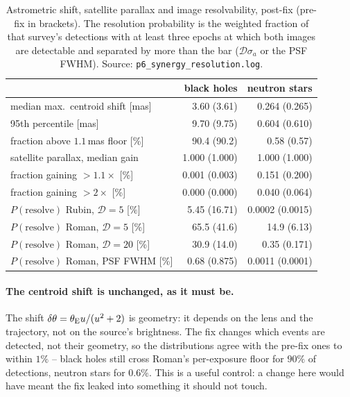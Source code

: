 \documentclass[english,10pt,a4paper]{article}
\newcommand{\tetE}{\theta_{\rm E}}
\begin{document}
\begin{table}[h]
\centering
\caption{Astrometric shift, satellite parallax and image resolvability, post-fix (pre-fix in
brackets). The resolution probability is the weighted fraction of that survey's detections with at
least three epochs at which both images are detectable and separated by more than the bar
($\mathcal{D}\sigma_a$ or the PSF FWHM). Source: \texttt{p6\_synergy\_resolution.log}.}
\label{tab:ast}
\begin{tabular}{lrr}
\toprule
 & black holes & neutron stars \\
\midrule
median max.\ centroid shift [mas]      & 3.60 (3.61)  & 0.264 (0.265) \\
95th percentile [mas]                  & 9.70 (9.75)  & 0.604 (0.610) \\
fraction above $1.1$\,mas floor [\%]   & 90.4 (90.2)  & 0.58 (0.57) \\
\midrule
satellite parallax, median gain        & 1.000 (1.000) & 1.000 (1.000) \\
\quad fraction gaining $>1.1\times$ [\%] & 0.001 (0.003) & 0.151 (0.200) \\
\quad fraction gaining $>2\times$ [\%]   & 0.000 (0.000) & 0.040 (0.064) \\
\midrule
$P(\text{resolve})$ Rubin, $\mathcal{D}=5$ [\%]  & 5.45 (16.71)  & 0.0002 (0.0015) \\
$P(\text{resolve})$ Roman, $\mathcal{D}=5$ [\%]  & 65.5 (41.6)   & 14.9 (6.13) \\
$P(\text{resolve})$ Roman, $\mathcal{D}=20$ [\%] & 30.9 (14.0)   & 0.35 (0.171) \\
$P(\text{resolve})$ Roman, PSF FWHM [\%]         & 0.68 (0.875)  & 0.0011 (0.0001) \\
\bottomrule
\end{tabular}
\end{table}

\paragraph{The centroid shift is unchanged, as it must be.} The shift
$\delta\theta = \tetE u/(u^2+2)$ is geometry: it depends on the lens and the trajectory, not on the
source's brightness. The fix changes which events are detected, not their geometry, so the
distributions agree with the pre-fix ones to within $1\%$ -- black holes still cross Roman's
per-exposure floor for $90\%$ of detections, neutron stars for $0.6\%$. This is a useful control:
a change here would have meant the fix leaked into something it should not touch.
\end{document}
